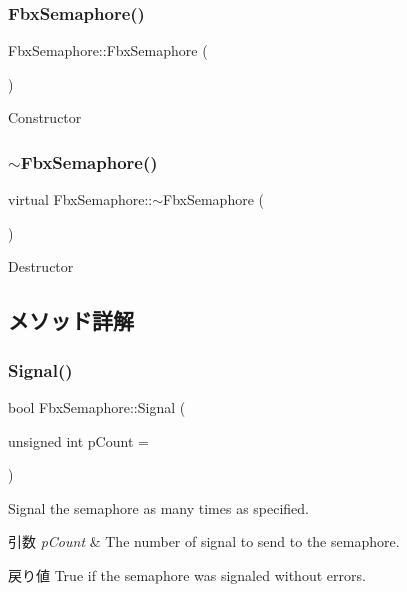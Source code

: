 \subsubsection{\texorpdfstring{Fbx\+Semaphore()}{FbxSemaphore()}}
{\footnotesize\ttfamily Fbx\+Semaphore\+::\+Fbx\+Semaphore (\begin{DoxyParamCaption}{ }\end{DoxyParamCaption})}



Constructor 

\mbox{\label{class_fbx_semaphore_aea00e26f6b9452107104eaf2f2e49f1b}} 
\subsubsection{\texorpdfstring{$\sim$\+Fbx\+Semaphore()}{~FbxSemaphore()}}
{\footnotesize\ttfamily virtual Fbx\+Semaphore\+::$\sim$\+Fbx\+Semaphore (\begin{DoxyParamCaption}{ }\end{DoxyParamCaption})\hspace{0.3cm}{\ttfamily [virtual]}}



Destructor 



\subsection{メソッド詳解}
\mbox{\label{class_fbx_semaphore_a56bdff92c29ea31a57003f207e52c672}} 
\subsubsection{\texorpdfstring{Signal()}{Signal()}}
{\footnotesize\ttfamily bool Fbx\+Semaphore\+::\+Signal (\begin{DoxyParamCaption}\item[{unsigned int}]{p\+Count = {} }\end{DoxyParamCaption})}

Signal the semaphore as many times as specified. 
\begin{DoxyParams}{引数}
{\em p\+Count} & The number of signal to send to the semaphore. \\
\hline
\end{DoxyParams}
\begin{DoxyReturn}{戻り値}
True if the semaphore was signaled without errors. 
\end{DoxyReturn}
\mbox{\label{class_fbx_semaphore_a05d7cdaa49c89691f22a26851be1f885}} 
